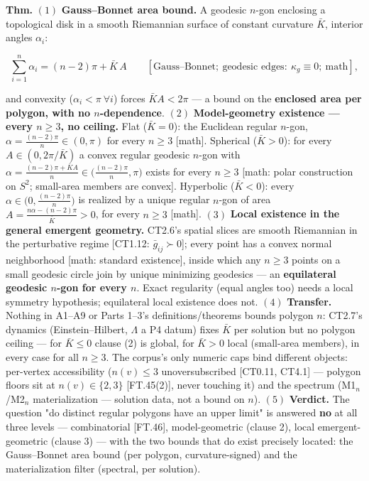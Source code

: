 \begin{theorem}\label{tag:FT-47}
\textbf{Thm.} $(1)$ \textbf{Gauss–Bonnet area bound.} A geodesic $n$-gon enclosing a topological disk in a smooth Riemannian surface of constant curvature $\bar K$, interior angles $\alpha_i$:

\[
\sum_{i=1}^n\alpha_i=(n-2)\pi+\bar K\,A\qquad[\text{Gauss–Bonnet};\ \text{geodesic edges}:\ \kappa_g\equiv0;\ \text{math}],
\]

and convexity ($\alpha_i<\pi\ \forall i$) forces $\bar K A<2\pi$ — a bound on the \textbf{enclosed area per polygon, with no $n$-dependence}. $(2)$ \textbf{Model-geometry existence — every $n\ge3$, no ceiling.} Flat ($\bar K=0$): the Euclidean regular $n$-gon, $\alpha=\frac{(n-2)\pi}{n}\in(0,\pi)$ for every $n\ge3$ [math]. Spherical ($\bar K>0$): for every $A\in(0,2\pi/\bar K)$ a convex regular geodesic $n$-gon with $\alpha=\frac{(n-2)\pi+\bar KA}{n}\in\bigl(\frac{(n-2)\pi}{n},\pi\bigr)$ exists for every $n\ge3$ [math: polar construction on $S^2$; small-area members are convex]. Hyperbolic ($\bar K<0$): every $\alpha\in\bigl(0,\frac{(n-2)\pi}{n}\bigr)$ is realized by a unique regular $n$-gon of area $A=\frac{n\alpha-(n-2)\pi}{\bar K}>0$, for every $n\ge3$ [math]. $(3)$ \textbf{Local existence in the general emergent geometry.} CT2.6's spatial slices are smooth Riemannian in the perturbative regime [CT1.12: $\bar g_{ij}\succ0$]; every point has a convex normal neighborhood [math: standard existence], inside which any $n\ge3$ points on a small geodesic circle join by unique minimizing geodesics — an \textbf{equilateral geodesic $n$-gon for every $n$}. Exact regularity (equal angles too) needs a local symmetry hypothesis; equilateral local existence does not. $(4)$ \textbf{Transfer.} Nothing in A1–A9 or Parts 1–3's definitions/theorems bounds polygon $n$: CT2.7's dynamics (Einstein–Hilbert, $\Lambda$ a P4 datum) fixes $\bar K$ per solution but no polygon ceiling — for $\bar K\le0$ clause (2) is global, for $\bar K>0$ local (small-area members), in every case for all $n\ge3$. The corpus's only numeric caps bind different objects: per-vertex accessibility ($n(v)\le3$ unoversubscribed [CT0.11, CT4.1] — polygon floors sit at $n(v)\in\{2,3\}$ [FT.45(2)], never touching it) and the spectrum (M1$_n$/M2$_n$ materialization — solution data, not a bound on $n$). $(5)$ \textbf{Verdict.} The question "do distinct regular polygons have an upper limit" is answered \textbf{no} at all three levels — combinatorial [FT.46], model-geometric (clause 2), local emergent-geometric (clause 3) — with the two bounds that do exist precisely located: the Gauss–Bonnet area bound (per polygon, curvature-signed) and the materialization filter (spectral, per solution).


\end{theorem}

